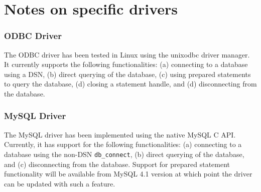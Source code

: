 \section{Notes on specific drivers}

\subsubsection{ODBC Driver}

The ODBC driver has been tested in Linux using the unixodbc driver manager.
It currently supports the following functionalities: (a) connecting to a 
database using a DSN, (b) direct querying of the database, (c) using 
prepared statements to query the database, (d) closing a statement handle, and
(d) disconnecting from the database. 

\subsubsection{MySQL Driver}

The MySQL driver has been implemented using the native MySQL C API. Currently, it
has support for the following functionalities: (a) connecting to 
a database using the non-DSN {\tt db\_connect}, (b) direct querying of
the database, and (c) disconnecting from the database. Support for prepared
statement functionality will be available from MySQL 4.1 version at which
point the driver can be updated with such a feature.

